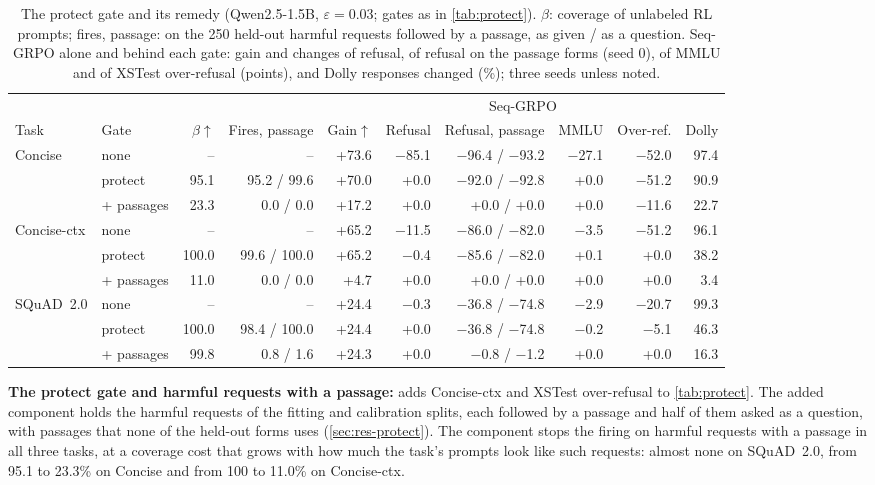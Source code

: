 \documentclass{article}
\theoremstyle{plain}
\theoremstyle{definition}
\theoremstyle{remark}
\begin{document}
\begin{table}[h]
\centering
\footnotesize
\setlength{\tabcolsep}{3pt}
\caption{The protect gate and its remedy (Qwen2.5-1.5B, $\varepsilon=0.03$; gates as in \cref{tab:protect}). $\beta$:
coverage of unlabeled RL prompts; fires, passage: on the 250 held-out harmful requests followed by a passage, as
given / as a question. Seq-GRPO alone and behind each gate: gain and changes of refusal, of refusal on the passage
forms (seed 0), of MMLU and of XSTest over-refusal (points), and Dolly responses changed (\%); three seeds unless noted.}
\label{tab:remedy}
\begin{tabular}{l l r r r r r r r r}
\toprule
 & & & & \multicolumn{6}{c}{Seq-GRPO} \\
\cmidrule(lr){5-10}
Task & Gate & $\beta\uparrow$ & Fires, passage & Gain$\uparrow$ & Refusal & Refusal, passage & MMLU & Over-ref. & Dolly \\
\midrule
Concise & none & -- & -- & +73.6 & $-$85.1 & $-$96.4 / $-$93.2 & $-$27.1 & $-$52.0 & 97.4 \\
 & protect & 95.1 & 95.2 / 99.6 & +70.0 & +0.0 & $-$92.0 / $-$92.8 & +0.0 & $-$51.2 & 90.9 \\
 & + passages & 23.3 & 0.0 / 0.0 & +17.2 & +0.0 & +0.0 / +0.0 & +0.0 & $-$11.6 & 22.7 \\
\midrule
Concise-ctx & none & -- & -- & +65.2 & $-$11.5 & $-$86.0 / $-$82.0 & $-$3.5 & $-$51.2 & 96.1 \\
 & protect & 100.0 & 99.6 / 100.0 & +65.2 & $-$0.4 & $-$85.6 / $-$82.0 & +0.1 & +0.0 & 38.2 \\
 & + passages & 11.0 & 0.0 / 0.0 & +4.7 & +0.0 & +0.0 / +0.0 & +0.0 & +0.0 & 3.4 \\
\midrule
SQuAD~2.0 & none & -- & -- & +24.4 & $-$0.3 & $-$36.8 / $-$74.8 & $-$2.9 & $-$20.7 & 99.3 \\
 & protect & 100.0 & 98.4 / 100.0 & +24.4 & +0.0 & $-$36.8 / $-$74.8 & $-$0.2 & $-$5.1 & 46.3 \\
 & + passages & 99.8 & 0.8 / 1.6 & +24.3 & +0.0 & $-$0.8 / $-$1.2 & +0.0 & +0.0 & 16.3 \\
\bottomrule
\end{tabular}
\end{table}



\textbf{The protect gate and harmful requests with a passage:}  adds Concise-ctx and XSTest
over-refusal to \cref{tab:protect}. The added component holds the harmful requests of the fitting and calibration
splits, each followed by a passage and half of them asked as a question, with passages that none of the held-out
forms uses (\cref{sec:res-protect}). The component stops the firing on harmful requests with a passage in all three
tasks, at a coverage cost that grows with how much the task's prompts look like such requests: almost none on
SQuAD~2.0, from 95.1 to 23.3\% on Concise and from 100 to 11.0\% on Concise-ctx.
\end{document}
